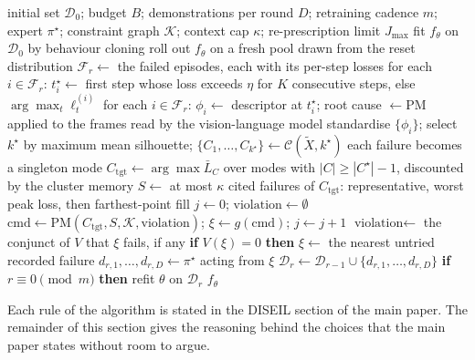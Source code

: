 \documentclass[letterpaper]{article}
\begin{document}
\begin{algorithm}[t]
\caption{DISEIL. One run under a budget $B$.}
\label{alg:diseil}
\begin{algorithmic}[1]
\REQUIRE initial set $\mathcal{D}_0$; budget $B$; demonstrations per round $D$;
retraining cadence $m$; expert $\pi^\star$; constraint graph $\mathcal{K}$; context cap
$\kappa$; re-prescription limit $J_{\max}$
\STATE fit $f_\theta$ on $\mathcal{D}_0$ by behaviour cloning
  \STATE roll out $f_\theta$ on a fresh pool drawn from the reset distribution
  \STATE $\mathcal{F}_r \leftarrow$ the failed episodes, each with its per-step losses
  \STATE for each $i \in \mathcal{F}_r$: $t^\star_i \leftarrow$ first step whose loss
         exceeds $\eta$ for $K$ consecutive steps, else $\arg\max_t \ell^{(i)}_t$
  \STATE for each $i \in \mathcal{F}_r$: $\phi_i \leftarrow$ descriptor at $t^\star_i$;
         root cause $\leftarrow \mathrm{PM}$ applied to the frames read by the
         vision-language model
    \STATE standardise $\{\phi_i\}$; select $k^\star$ by maximum mean silhouette;
           $\{C_1,\dots,C_{k^\star}\} \leftarrow \mathcal{C}(\tilde{X}, k^\star)$
  \ELSE
    \STATE each failure becomes a singleton mode
  \ENDIF
  \STATE $C_{\mathrm{tgt}} \leftarrow \arg\max \bar{L}_C$ over modes with
         $|C| \ge |C^\star| - 1$, discounted by the cluster memory
  \STATE $S \leftarrow$ at most $\kappa$ cited failures of $C_{\mathrm{tgt}}$:
         representative, worst peak loss, then farthest-point fill
  \STATE $j \leftarrow 0$; $\text{violation} \leftarrow \emptyset$
  \REPEAT
    \STATE $\mathrm{cmd} \leftarrow \mathrm{PM}(C_{\mathrm{tgt}}, S, \mathcal{K},
           \text{violation})$; $\xi \leftarrow g(\mathrm{cmd})$; $j \leftarrow j + 1$
    \STATE $\text{violation} \leftarrow$ the conjunct of $V$ that $\xi$ fails, if any
  \STATE \textbf{if} $V(\xi) = 0$ \textbf{then} $\xi \leftarrow$ the nearest untried
         recorded failure
  \STATE $d_{r,1},\dots,d_{r,D} \leftarrow \pi^\star$ acting from $\xi$
  \STATE $\mathcal{D}_r \leftarrow \mathcal{D}_{r-1} \cup \{d_{r,1},\dots,d_{r,D}\}$
  \STATE \textbf{if} $r \equiv 0 \pmod m$ \textbf{then} refit $\theta$ on
         $\mathcal{D}_r$
\ENDFOR
\RETURN $f_\theta$
\end{algorithmic}
\end{algorithm}

Each rule of the algorithm is stated in the DISEIL section of the main paper. The
remainder of this section gives the reasoning behind the choices that the main paper
states without room to argue.
\end{document}
